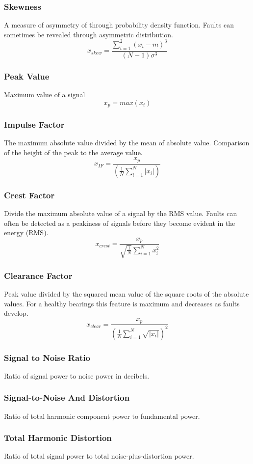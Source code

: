 \documentclass{article}
\begin{document}
\subsubsection{Skewness} 
A measure of asymmetry of through probability density function. Faults can sometimes be revealed through asymmetric distribution.
$$ x_{skew} = \frac{\sum^2_{i=1}(x_i-m)^3}{(N-1)\sigma^3} $$
\subsubsection{Peak Value}
Maximum value of a signal
$$ x_p = max(x_i) $$ 
\subsubsection{Impulse Factor} 
The maximum absolute value divided by the mean of absolute value. Comparison of the height of the peak to the average value.
$$ x_{IF} = \frac{x_p}{(\frac{1}{N}\sum^N_{i=1}|x_i|)} $$  
\subsubsection{Crest Factor} 
Divide the maximum absolute value of a signal by the RMS value.
Faults can often be detected as a peakiness of signals before they become evident in the energy (RMS).
$$ x_{crest} = \frac{x_p}{\sqrt{\frac{1}{N}}\sum^N_{i=1}x^2_i} $$
\subsubsection{Clearance Factor} 
Peak value divided by the squared mean value of the square roots of the absolute values. For a healthy bearings this feature is maximum and decreases as faults develop.
$$ x_{clear} = \frac{x_p}{(\frac{1}{N}\sum^N_{i=1}\sqrt{|x_i|})^2} $$
\subsubsection{Signal to Noise Ratio}
Ratio of signal power to noise power in decibels.
\subsubsection{Signal-to-Noise And Distortion}
Ratio of total harmonic component power to fundamental power.
\subsubsection{Total Harmonic Distortion}
Ratio of total signal power to total noise-plus-distortion power.
\end{document}
